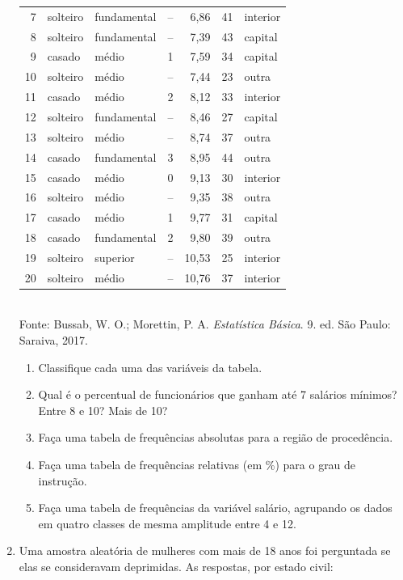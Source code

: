\documentclass[11pt]{article}
\begin{document}
\begin{enumerate}[label=\textbf{C\arabic*.}, leftmargin=*]
\begin{center}
\begin{tabular}{rllrrrl}
7 & solteiro & fundamental & -- & 6,86 & 41 & interior \\
8 & solteiro & fundamental & -- & 7,39 & 43 & capital \\
9 & casado & médio & 1 & 7,59 & 34 & capital \\
10 & solteiro & médio & -- & 7,44 & 23 & outra \\
11 & casado & médio & 2 & 8,12 & 33 & interior \\
12 & solteiro & fundamental & -- & 8,46 & 27 & capital \\
13 & solteiro & médio & -- & 8,74 & 37 & outra \\
14 & casado & fundamental & 3 & 8,95 & 44 & outra \\
15 & casado & médio & 0 & 9,13 & 30 & interior \\
16 & solteiro & médio & -- & 9,35 & 38 & outra \\
17 & casado & médio & 1 & 9,77 & 31 & capital \\
18 & casado & fundamental & 2 & 9,80 & 39 & outra \\
19 & solteiro & superior & -- & 10,53 & 25 & interior \\
20 & solteiro & médio & -- & 10,76 & 37 & interior \\
\bottomrule
\end{tabular}\\[0.3em]
{\footnotesize Fonte: Bussab, W. O.; Morettin, P. A. \textit{Estatística Básica}. 9. ed. São Paulo: Saraiva, 2017.}
\end{center}
\begin{enumerate}[label=(\alph*)]
  \item Classifique cada uma das variáveis da tabela.
  \item Qual é o percentual de funcionários que ganham até 7 salários mínimos? Entre 8 e 10? Mais de 10?
  \item Faça uma tabela de frequências absolutas para a região de procedência.
  \item Faça uma tabela de frequências relativas (em \%) para o grau de instrução.
  \item Faça uma tabela de frequências da variável salário, agrupando os dados em quatro classes de mesma amplitude entre 4 e 12.
\end{enumerate}
\item Uma amostra aleatória de mulheres com mais de 18 anos foi perguntada se elas se consideravam deprimidas. As respostas, por estado civil:
\begin{center}

\end{center}
\end{enumerate}
\end{document}
